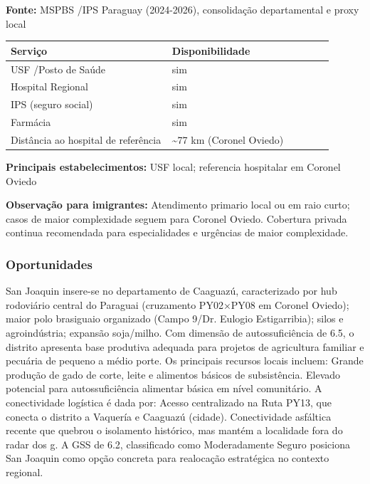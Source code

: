 \textbf{Fonte:} MSPBS /\allowbreak  IPS Paraguay (2024-2026), consolidação
departamental e proxy local

{\def\LTcaptype{none} %
\begin{longtable}{@{}>{\raggedright\arraybackslash}p{0.45\linewidth} >{\raggedright\arraybackslash}p{0.45\linewidth}@{}}
\toprule\noalign{}
Serviço & Disponibilidade \\
\midrule\noalign{}
\endhead
\bottomrule\noalign{}
\endlastfoot
USF /\allowbreak  Posto de Saúde & sim \\
Hospital Regional & sim \\
IPS (seguro social) & sim \\
Farmácia & sim \\
Distância ao hospital de referência & \textasciitilde77 km (Coronel
Oviedo) \\
\end{longtable}
}

\textbf{Principais estabelecimentos:} USF local; referencia hospitalar
em Coronel Oviedo

\textbf{Observação para imigrantes:} Atendimento primario local ou em
raio curto; casos de maior complexidade seguem para Coronel Oviedo.
Cobertura privada continua recomendada para especialidades e urgências
de maior complexidade.
\newpage

\subsubsection*{Oportunidades}\label{oport-san-joaquin-0509}
San Joaquin insere-se no departamento de Caaguazú, caracterizado por hub rodoviário central do Paraguai (cruzamento PY02×PY08 em Coronel Oviedo); maior polo brasiguaio organizado (Campo 9/Dr. Eulogio Estigarribia); silos e agroindústria; expansão soja/milho. Com dimensão de autossuficiência de 6.5, o distrito apresenta base produtiva adequada para projetos de agricultura familiar e pecuária de pequeno a médio porte. Os principais recursos locais incluem: Grande produção de gado de corte, leite e alimentos básicos de subsistência. Elevado potencial para autossuficiência alimentar básica em nível comunitário. A conectividade logística é dada por: Acesso centralizado na Ruta PY13, que conecta o distrito a Vaquería e Caaguazú (cidade). Conectividade asfáltica recente que quebrou o isolamento histórico, mas mantém a localidade fora do radar dos g. A GSS de 6.2, classificado como Moderadamente Seguro posiciona San Joaquin como opção concreta para realocação estratégica no contexto regional.


